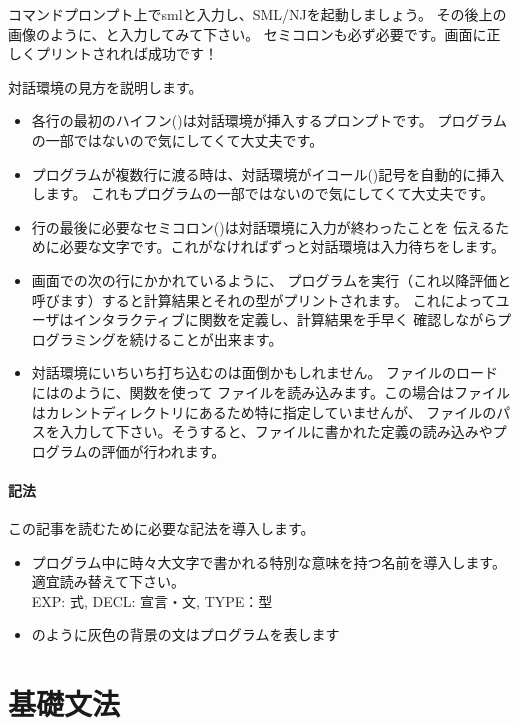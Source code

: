 \documentclass[11pt,a4paper]{jarticle}
\begin{document}
コマンドプロンプト上でsmlと入力し、SML/NJを起動しましょう。
その後上の画像のように、と入力してみて下さい。
セミコロンも必ず必要です。画面に正しくプリントされれば成功です！

対話環境の見方を説明します。
\begin{itemize}
\item 各行の最初のハイフン(\prog{-})は対話環境が挿入するプロンプトです。
  プログラムの一部ではないので気にしてくて大丈夫です。
\item プログラムが複数行に渡る時は、対話環境がイコール(\prog{=})記号を自動的に挿入します。
  これもプログラムの一部ではないので気にしてくて大丈夫です。
\item 行の最後に必要なセミコロン(\prog{;})は対話環境に入力が終わったことを
  伝えるために必要な文字です。これがなければずっと対話環境は入力待ちをします。
\item 画面での次の行にかかれているように、
  プログラムを実行（これ以降評価と呼びます）すると計算結果とそれの型がプリントされます。
  これによってユーザはインタラクティブに関数を定義し、計算結果を手早く
  確認しながらプログラミングを続けることが出来ます。
\item 対話環境にいちいち打ち込むのは面倒かもしれません。
  ファイルのロードにはのように、関数を使って
  ファイルを読み込みます。この場合はファイルはカレントディレクトリにあるため特に指定していませんが、
  ファイルのパスを入力して下さい。そうすると、ファイルに書かれた定義の読み込みやプログラムの評価が行われます。
\end{itemize}

\subsection{記法}

この記事を読むために必要な記法を導入します。

\begin{itemize}
\item プログラム中に時々大文字で書かれる特別な意味を持つ名前を導入します。適宜読み替えて下さい。\\
  EXP: 式, DECL: 宣言・文, TYPE：型
\item {}のように灰色の背景の文はプログラムを表します
\end{itemize}


\part{基礎文法}
\end{document}
